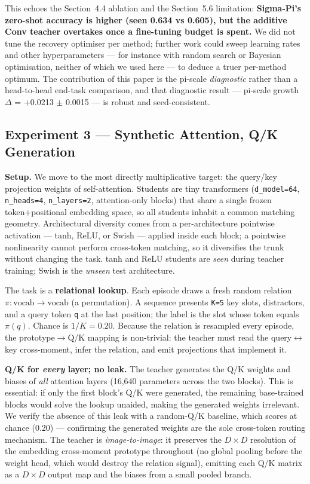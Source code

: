 \documentclass{article}
\begin{document}
This echoes the Section~4.4 ablation and the Section~5.6 limitation: \textbf{Sigma-Pi's zero-shot accuracy is higher (seen 0.634 vs 0.605), but the additive Conv teacher overtakes once a fine-tuning budget is spent.} We did not tune the recovery optimiser per method; further work could sweep learning rates and other hyperparameters --- for instance with random search or Bayesian optimisation, neither of which we used here --- to deduce a truer per-method optimum. The contribution of this paper is the pi-scale \emph{diagnostic} rather than a head-to-head end-task comparison, and that diagnostic result --- pi-scale growth $\Delta$ = +0.0213 $\pm$ 0.0015 --- is robust and seed-consistent.

\subsection{Experiment 3 --- Synthetic Attention, Q/K Generation}\label{experiment-3-synthetic-attention-qk-generation}

\textbf{Setup.} We move to the most directly multiplicative target: the query/key projection weights of self-attention. Students are tiny transformers (\texttt{d\_model=64}, \texttt{n\_heads=4}, \texttt{n\_layers=2}, attention-only blocks) that share a single frozen token+positional embedding space, so all students inhabit a common matching geometry. Architectural diversity comes from a per-architecture pointwise activation --- tanh, ReLU, or Swish --- applied inside each block; a pointwise nonlinearity cannot perform cross-token matching, so it diversifies the trunk without changing the task. tanh and ReLU students are \emph{seen} during teacher training; Swish is the \emph{unseen} test architecture.

The task is a \textbf{relational lookup}. Each episode draws a fresh random relation $\pi:\mathrm{vocab}\to\mathrm{vocab}$ (a permutation). A sequence presents \texttt{K=5} key slots, distractors, and a query token \texttt{q} at the last position; the label is the slot whose token equals $\pi(q)$. Chance is $1/K=0.20$. Because the relation is resampled every episode, the prototype$\to$Q/K mapping is non-trivial: the teacher must read the query$\leftrightarrow$key cross-moment, infer the relation, and emit projections that implement it.

\textbf{Q/K for \emph{every} layer; no leak.} The teacher generates the Q/K weights and biases of \emph{all} attention layers (16,640 parameters across the two blocks). This is essential: if only the first block's Q/K were generated, the remaining base-trained blocks would solve the lookup unaided, making the generated weights irrelevant. We verify the absence of this leak with a random-Q/K baseline, which scores at chance (0.20) --- confirming the generated weights are the sole cross-token routing mechanism. The teacher is \emph{image-to-image}: it preserves the $D\times D$ resolution of the embedding cross-moment prototype throughout (no global pooling before the weight head, which would destroy the relation signal), emitting each Q/K matrix as a $D\times D$ output map and the biases from a small pooled branch.
\end{document}

